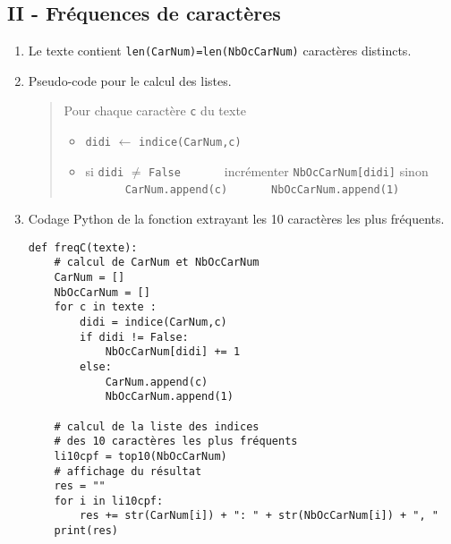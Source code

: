 \subsection*{II - Fréquences de caractères}
\begin{enumerate}
  \item Le texte contient \texttt{len(CarNum)=len(NbOcCarNum)} caractères distincts.
  \item Pseudo-code pour le calcul des listes.
\begin{quote}
  Pour chaque caractère \texttt{c} du texte
  \begin{itemize}
    \item \texttt{didi} $\leftarrow$ \texttt{indice(CarNum,c)}
    \item si \texttt{didi} $\neq$ \texttt{False}\newline
    $\phantom{:}\hspace{1cm}$ incrémenter \texttt{NbOcCarNum[didi]}\newline
    sinon\newline
    $\phantom{:}\hspace{1cm}$ \texttt{CarNum.append(c)}\newline
    $\phantom{:}\hspace{1cm}$ \texttt{NbOcCarNum.append(1)}
  \end{itemize}
\end{quote}

  \item Codage Python de la fonction extrayant les 10 caractères les plus fréquents.
\begin{verbatim}
def freqC(texte):
    # calcul de CarNum et NbOcCarNum
    CarNum = []
    NbOcCarNum = []
    for c in texte :
        didi = indice(CarNum,c)
        if didi != False:
            NbOcCarNum[didi] += 1
        else:
            CarNum.append(c)
            NbOcCarNum.append(1)
            
    # calcul de la liste des indices
    # des 10 caractères les plus fréquents
    li10cpf = top10(NbOcCarNum)
    # affichage du résultat
    res = ""
    for i in li10cpf:
        res += str(CarNum[i]) + ": " + str(NbOcCarNum[i]) + ", "
    print(res)
\end{verbatim}

\end{enumerate}

